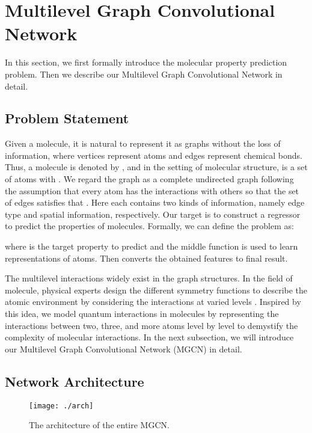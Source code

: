 \documentclass[letterpaper]{article} \usepackage{bm}
\begin{document}
\section{Multilevel Graph Convolutional Network}
In this section, we first formally introduce the molecular property prediction problem. Then we describe our Multilevel Graph Convolutional Network in detail.


\subsection{Problem Statement}
Given a molecule, it is natural to represent it as graphs without the loss of information, where vertices represent atoms and edges represent chemical bonds. Thus, a molecule is denoted by , and in the setting of molecular structure,   is a set of atoms with . We regard the graph as a complete undirected graph following the assumption that every atom has the interactions with others so that the set of edges satisfies that . Here each  contains two kinds of information, namely edge type and spatial information, respectively. Our target is to construct a regressor to predict the properties of molecules. Formally, we can define the problem as:  
    
where  is the target property to predict and the middle function  is used to learn representations of atoms. Then  converts the obtained features to final result.   

The multilevel interactions widely exist in the graph structures. In the field of molecule, physical experts design the different symmetry functions to describe the atomic environment by considering the interactions at varied levels \cite{behler2014representing}. Inspired by this idea, we model quantum interactions in molecules by representing the interactions between two, three, and more atoms level by level to demystify the complexity of molecular interactions. In the next subsection, we will introduce our Multilevel Graph Convolutional Network (MGCN) in detail.   


\subsection{Network Architecture}  
  
\begin{figure*}[tb]
\centerline{\texttt{[image: ./arch]}}
\caption{The architecture of the entire MGCN.} 
\label{network}
\end{figure*}
\end{document}
